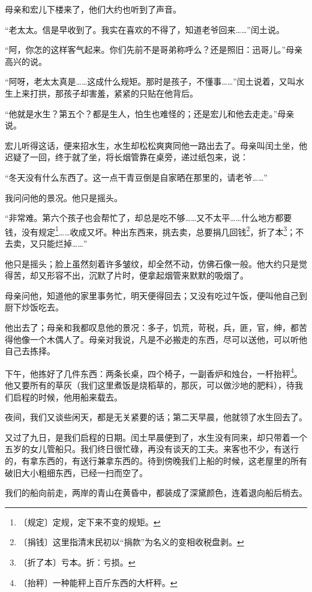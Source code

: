\documentclass[12pt,UTF-8,openany]{ctexbook}
\begin{document}
\begin{large}
    母亲和宏儿下楼来了，他们大约也听到了声音。
    
    “老太太。信是早收到了。我实在喜欢的不得了，知道老爷回来……”闰土说。
    
    “阿，你怎的这样客气起来。你们先前不是哥弟称呼么？还是照旧：迅哥儿。”母亲高兴的说。
    
    “阿呀，老太太真是……这成什么规矩。那时是孩子，不懂事……”闰土说着，又叫水生上来打拱，那孩子却害羞，紧紧的只贴在他背后。
    
    “他就是水生？第五个？都是生人，怕生也难怪的；还是宏儿和他去走走。”母亲说。
    
    宏儿听得这话，便来招水生，水生却松松爽爽同他一路出去了。母亲叫闰土坐，他迟疑了一回，终于就了坐，将长烟管靠在桌旁，递过纸包来，说：
    
    “冬天没有什么东西了。这一点干青豆倒是自家晒在那里的，请老爷……”
    
    我问问他的景况。他只是摇头。
    
    “非常难。第六个孩子也会帮忙了，却总是吃不够……又不太平……什么地方都要钱，没有规定\footnote{〔规定〕定规，定下来不变的规矩。}……收成又坏。种出东西来，挑去卖，总要捐几回钱\footnote{〔捐钱〕这里指清末民初以“捐款”为名义的变相收税盘剥。}，折了本\footnote{〔折了本〕亏本。折：亏损。}；不去卖，又只能烂掉……”
    
    他只是摇头；脸上虽然刻着许多皱纹，却全然不动，仿佛石像一般。他大约只是觉得苦，却又形容不出，沉默了片时，便拿起烟管来默默的吸烟了。
    
    母亲问他，知道他的家里事务忙，明天便得回去；又没有吃过午饭，便叫他自己到厨下炒饭吃去。
    
    他出去了；母亲和我都叹息他的景况：多子，饥荒，苛税，兵，匪，官，绅，都苦得他像一个木偶人了。母亲对我说，凡是不必搬走的东西，尽可以送他，可以听他自己去拣择。
    
    下午，他拣好了几件东西：两条长桌，四个椅子，一副香炉和烛台，一杆抬秤\footnote{〔抬秤〕一种能秤上百斤东西的大杆秤。}。他又要所有的草灰（我们这里煮饭是烧稻草的，那灰，可以做沙地的肥料），待我们启程的时候，他用船来载去。
    
    夜间，我们又谈些闲天，都是无关紧要的话；第二天早晨，他就领了水生回去了。
    
    又过了九日，是我们启程的日期。闰土早晨便到了，水生没有同来，却只带着一个五岁的女儿管船只。我们终日很忙碌，再没有谈天的工夫。来客也不少，有送行的，有拿东西的，有送行兼拿东西的。待到傍晚我们上船的时候，这老屋里的所有破旧大小粗细东西，已经一扫而空了。
    
    我们的船向前走，两岸的青山在黄昏中，都装成了深黛颜色，连着退向船后梢去。
    

\end{large}
\end{document}
